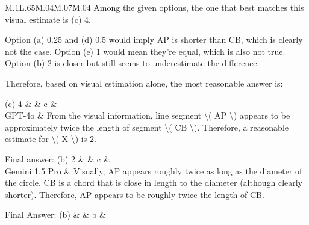 \begin{table*}[t]
\begin{tabular}{M{.1\linewidth}L{.65\linewidth}M{.04\linewidth}M{.07\linewidth}M{.04\linewidth}}
Among the given options, the one that best matches this visual estimate is (c) 4.

Option (a) 0.25 and (d) 0.5 would imply AP is shorter than CB, which is clearly not the case.
Option (e) 1 would mean they're equal, which is also not true.
Option (b) 2 is closer but still seems to underestimate the difference.

Therefore, based on visual estimation alone, the most reasonable answer is:

(c) 4 & \cmark & c & \cmark \\
\midrule
GPT-4o & From the visual information, line segment \textbackslash ( AP \textbackslash ) appears to be approximately twice the length of segment \textbackslash ( CB \textbackslash ). Therefore, a reasonable estimate for \textbackslash ( X \textbackslash ) is 2.

Final answer: (b) 2 & \xmark & c & \cmark \\
\midrule
Gemini 1.5 Pro & Visually, AP appears roughly twice as long as the diameter of the circle. CB is a chord that is close in length to the diameter (although clearly shorter).  Therefore, AP appears to be roughly twice the length of CB.

Final Answer: (b) & \xmark & b & \xmark \\
\bottomrule
    \end{tabular}
    \caption{Examples of dataset and model responses for \texttt{Geometry-Length} (1)} \label{tab:examples_Geometry-Length_1}%
\end{table*}
%
%
%
\clearpage
%
%
%
